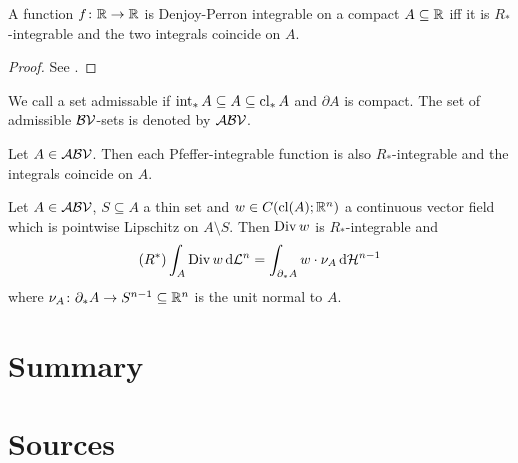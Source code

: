 \begin{frame}
	\begin{proposition}
	A function $f\colon\mathbb{R}\to\mathbb{R}$ is Denjoy-Perron integrable on a compact $A\subseteq\mathbb{R}$ iff it is $R_*$-integrable and the two integrals coincide on $A$.
	\end{proposition}
	\begin{proof}
	See \cite[Proposition 3.6]{Pfe2016}.
	\end{proof}
\end{frame}

\begin{frame}
	\begin{definition}
	We call a set admissable if $\operatorname{int}_*A\subseteq A\subseteq \operatorname{cl}_*A$ and $\partial A$ is compact. The set of admissible $\mathcal{BV}$-sets is denoted by $\mathcal{ABV}$.
	\end{definition}
	
	\begin{proposition}\label{pr:GeneralisationPfeffer}
	Let $A\in\mathcal{ABV}$. Then each Pfeffer-integrable function is also $R_*$-integrable and the integrals coincide on $A$.
	\end{proposition}
\end{frame}

\begin{frame}
	\begin{theorem}
	Let $A\in\mathcal{ABV}$, $S\subseteq A$ a thin set and $w\in C(\operatorname{cl}(A);\mathbb{R}^n)$ a continuous vector field which is pointwise Lipschitz on $A\setminus S$. Then $\operatorname{Div} w$ is $R_*$-integrable and
	\begin{align*}
		(R^*)\int_A\operatorname{Div} w\,\mathrm{d} \mathcal{L}^n=\int_{\partial_* A}w\cdot \nu_A\,\mathrm{d} \mathcal{H}^{n-1}
	\end{align*}
	where $\nu_A\colon \partial_* A\to S^{n-1}\subseteq\mathbb{R}^n$ is the unit normal to $A$.
	\end{theorem}
\end{frame}


\section{Summary}

\section*{Sources}

